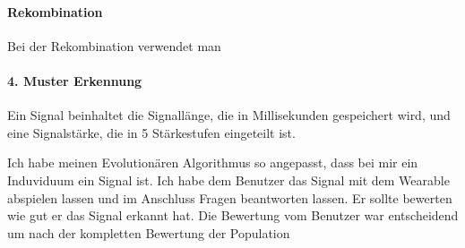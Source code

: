 \paragraph{Rekombination}
Bei der Rekombination verwendet man 





\paragraph {4. Muster Erkennung} 

Ein Signal beinhaltet die Signall{\"a}nge, die in Millisekunden gespeichert wird, und eine Signalst{\"a}rke, die in 5 St{\"a}rkestufen eingeteilt ist. 



Ich habe meinen Evolution{\"a}ren Algorithmus so angepasst, dass bei mir ein Induviduum ein Signal ist. 
Ich habe dem Benutzer das Signal mit dem Wearable abspielen lassen und im Anschluss Fragen beantworten lassen. 
Er sollte bewerten wie gut er das Signal erkannt hat. Die Bewertung vom Benutzer war entscheidend um nach der kompletten Bewertung der Population 











